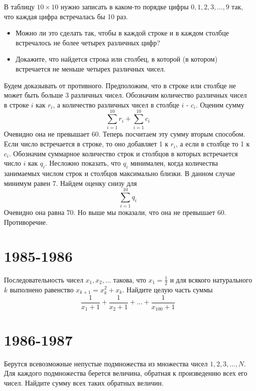 \documentclass[11pt, a4paper]{template}
\begin{document}
\begin{exercise}
В таблицу $10 \times 10$ нужно записать в каком-то порядке цифры $0, 1, 2, 3, \dots, 9$ так, что каждая цифра встречалась бы 10 раз.
\begin{itemize}
\item Можно ли это сделать так, чтобы в каждой строке и в каждом столбце встречалось не более четырех различных цифр?
\item Докажите, что найдется строка или столбец, в которой (в котором) встречается не меньше четырех различных чисел.
\end{itemize}
\end{exercise}

\begin{solution}
Будем доказывать от противного. Предположим, что в строке или столбце не может быть больше 3 различных чисел. Обозначим количество различных чисел в строке $i$ как $r_{i}$, а количество различных чисел в столбце $i$ - $c_{i}$. Оценим сумму
$$
\sum_{i = 1}^{10} r_{i} + \sum_{i = 1}^{10} c_{i} 
$$
Очевидно она не превышает 60. Теперь посчитаем эту сумму вторым способом. Если число встречается в строке, то оно добавляет 1 к $r_{i}$, а если в столбце то 1 к $c_{i}$. Обозначим суммарное количество строк и столбцов в которых встречается число $i$ как $q_{i}$. Несложно показать, что $q_{i}$ минимален, когда количества занимаемых числом строк и столбцов максимально близки. В данном случае минимум равен 7. Найдем оценку снизу для
$$
\sum_{i = 1}^{10} q_{i}
$$
Очевидно она равна 70. Но выше мы показали, что она не превышает 60. Противоречие.
\end{solution}

\chapter{1985-1986}

\begin{exercise}
Последовательность чисел $x_{1}, x_{2}, \dots$ такова, что $x_{1} = \frac{1}{2}$ и для всякого натурального $k$ выполнено равенство $x_{k+1} = x_{k}^{2} + x_{k}$. Найдите целую часть суммы
$$
\frac{1}{x_{1}+1} + \frac{1}{x_{2}+1} + \dots + \frac{1}{x_{100}+1}
$$
\end{exercise}

\chapter{1986-1987}

\begin{exercise}
Берутся всевозможные непустые подмножества из множества чисел $1, 2, 3, \dots, N$. Для каждого подмножества берется величина, обратная к произведению всех его чисел. Найдите сумму всех таких обратных величин.
\end{exercise}
\end{document}
